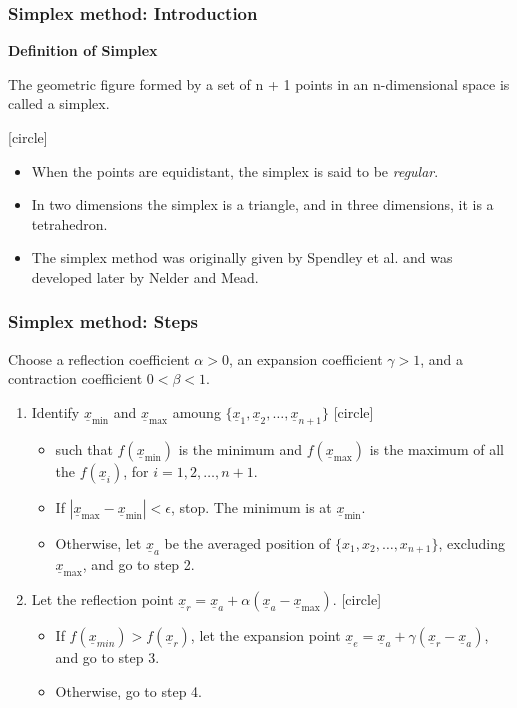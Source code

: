\documentclass{beamer}
\begin{document}
\begin{frame}
    \frametitle{Simplex method: Introduction}
    \textbf{Definition of Simplex}

    The geometric figure formed by a set of n + 1 points in an
    n-dimensional space is called a simplex.

    [circle]
    \begin{itemize}
        \item When the points are equidistant, the simplex is said to be \textit{regular}.
        \item In two dimensions the simplex is a triangle, and in three dimensions, it is a tetrahedron.
        \item The simplex method was originally given by Spendley et al. and was developed later by Nelder and Mead.
    \end{itemize}    
\end{frame}

\begin{frame}
    \frametitle{Simplex method: Steps}
    Choose a reflection coefficient $\alpha>0$, an expansion coefficient $\gamma>1$, and a contraction coefficient $0<\beta<1$.
    \hfill \break
    \begin{enumerate}
        \item Identify $\underline{x}_{\min}$ and $\underline{x}_{\max}$ amoung
            $\{\underline{x}_1, \underline{x}_2,\dots,\underline{x}_{n+1}\}$
            [circle]
            \begin{itemize}
                \item such that $f(\underline{x}_{\min})$ is the minimum
                and $f(\underline{x}_{\max})$ is the maximum
                of all the $f(\underline{x}_i)$, for $i=1, 2, \dots,n+1$.
                \item If $|\underline{x}_{\max}-\underline{x}_{\min}|<\epsilon$, stop.
                The minimum is at $\underline{x}_{\min}$.
                \item Otherwise, let $\underline{x}_a$ be the averaged position of $\{x_1, x_2, \dots, x_{n+1}\}$,
                excluding $\underline{x}_{\max}$, and go to step 2.
            \end{itemize}
        \item Let the reflection point $\underline{x}_r=\underline{x}_a+\alpha (\underline{x}_a-\underline{x}_{\max})$.
        [circle]
        \begin{itemize}
            \item If $f(\underline{x}_{min})>f(\underline{x}_{r})$, let the expansion point $\underline{x}_e=\underline{x}_a+\gamma (\underline{x}_r-\underline{x}_a)$,
            and go to step 3.
            \item Otherwise, go to step 4.
        \end{itemize}
    \end{enumerate}
\end{frame}
\end{document}
